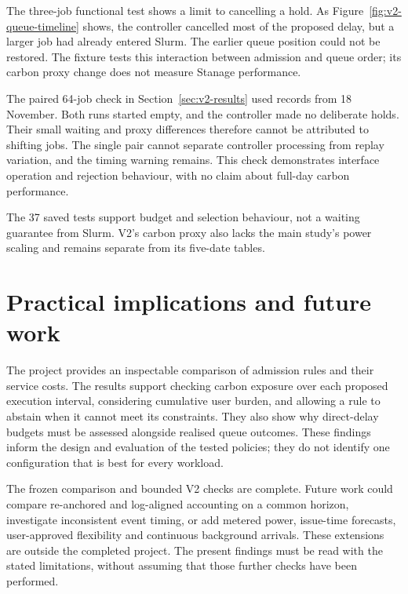 The three-job functional test shows a limit to cancelling a hold. As Figure~\ref{fig:v2-queue-timeline} shows, the controller cancelled most of the proposed delay, but a larger job had already entered Slurm. The earlier queue position could not be restored. The fixture tests this interaction between admission and queue order; its carbon proxy change does not measure Stanage performance.

The paired 64-job check in Section~\ref{sec:v2-results} used records from 18 November. Both runs started empty, and the controller made no deliberate holds. Their small waiting and proxy differences therefore cannot be attributed to shifting jobs. The single pair cannot separate controller processing from replay variation, and the timing warning remains. This check demonstrates interface operation and rejection behaviour, with no claim about full-day carbon performance.

The 37 saved tests support budget and selection behaviour, not a waiting guarantee from Slurm. V2's carbon proxy also lacks the main study's power scaling and remains separate from its five-date tables.

\section{Practical implications and future work}
The project provides an inspectable comparison of admission rules and their service costs. The results support checking carbon exposure over each proposed execution interval, considering cumulative user burden, and allowing a rule to abstain when it cannot meet its constraints. They also show why direct-delay budgets must be assessed alongside realised queue outcomes. These findings inform the design and evaluation of the tested policies; they do not identify one configuration that is best for every workload.

The frozen comparison and bounded V2 checks are complete. Future work could compare re-anchored and log-aligned accounting on a common horizon, investigate inconsistent event timing, or add metered power, issue-time forecasts, user-approved flexibility and continuous background arrivals. These extensions are outside the completed project. The present findings must be read with the stated limitations, without assuming that those further checks have been performed.
